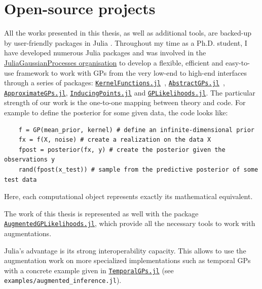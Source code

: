 \section{Open-source projects}

All the works presented in this thesis, as well as additional tools, are backed-up by user-friendly packages in Julia \cite{Julia-2017}.
Throughout my time as a Ph.D. student, I have developed numerous Julia packages and was involved in the \href{https://github.com/JuliaGaussianProcesses}{JuliaGaussianProcesses organisation} to develop a flexible, efficient and easy-to-use framework to work with \acp{GP} from the very low-end to high-end interfaces through a series of packages: \href{https://github.com/JuliaGaussianProcesses/KernelFunctions.jl}{\texttt{KernelFunctions.jl}}~\cite{theo_galy_fajou_2022_6246597}, \href{https://github.com/JuliaGaussianProcesses/AbstractGPs.jl}{\texttt{AbstractGPs.jl}}~\cite{david_widmann_2022_5939997}, \href{https://github.com/JuliaGaussianProcesses/ApproximateGPs.jl}{\texttt{ApproximateGPs.jl}}, \href{https://github.com/JuliaGaussianProcesses/InducingPoints.jl}{\texttt{InducingPoints.jl}} and \href{https://github.com/JuliaGaussianProcesses/GPLikelihoods.jl}{\texttt{GPLikelihoods.jl}}.
The particular strength of our work is the one-to-one mapping between theory and code.
For example to define the posterior for some given data, the code looks like:
\begin{verbatim}
    f = GP(mean_prior, kernel) # define an infinite-dimensional prior
    fx = f(X, noise) # create a realization on the data X
    fpost = posterior(fx, y) # create the posterior given the observations y
    rand(fpost(x_test)) # sample from the predictive posterior of some test data
\end{verbatim}
Here, each computational object represents exactly its mathematical equivalent.

The work of this thesis is represented as well with the package \href{https://github.com/JuliaGaussianProcesses/AugmentedGPLikelihoods.jl}{\texttt{AugmentedGPLikelihoods.jl}}, which provide all the necessary tools to work with augmentations.

Julia's advantage is its strong interoperability capacity.
This allows to use the augmentation work on more specialized implementations such as temporal \acp{GP} with a concrete example given in \href{https://github.com/JuliaGaussianProcesses/TemporalGPs.jl}{\texttt{TemporalGPs.jl}} (see \texttt{examples/augmented\_inference.jl}).

